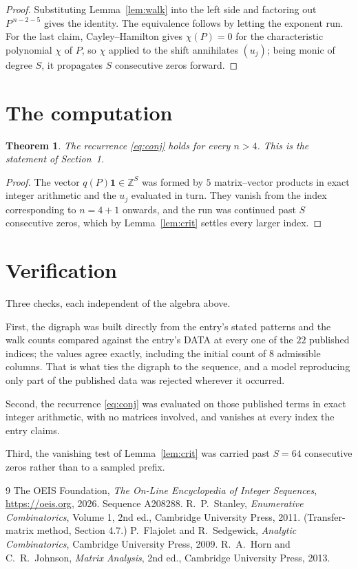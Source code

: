 \documentclass[11pt,a4paper]{article}
\theoremstyle{plain}
\newtheorem{theorem}{Theorem}
\theoremstyle{definition}
\begin{document}
\begin{proof}
Substituting Lemma~\ref{lem:walk} into the left side and factoring out
$P^{\,n-2-5}$ gives the identity. The equivalence follows by letting the exponent
run. For the last claim, Cayley--Hamilton gives $\chi(P)=0$ for the characteristic
polynomial $\chi$ of $P$, so $\chi$ applied to the shift annihilates $(u_j)$; being monic of
degree $S$, it propagates $S$ consecutive zeros forward.
\end{proof}

\section{The computation}

\begin{theorem}
The recurrence \eqref{eq:conj} holds for every $n>4$. This is the statement of
Section~1.
\end{theorem}

\begin{proof}
The vector $q(P)\mathbf{1}\in\mathbb{Z}^{S}$ was formed by $5$ matrix--vector
products in exact integer arithmetic and the $u_j$ evaluated in turn. They vanish from the
index corresponding to $n=4+1$ onwards, and the run was continued past $S$ consecutive
zeros, which by Lemma~\ref{lem:crit} settles every larger index.
\end{proof}

\section{Verification}

Three checks, each independent of the algebra above.

First, the digraph was built directly from the entry's stated patterns and the walk counts
compared against the entry's DATA at every one of the $22$ published indices; the
values agree exactly, including the initial count of $8$ admissible columns. That is
what ties the digraph to the sequence, and a model reproducing only part of the published
data was rejected wherever it occurred.

Second, the recurrence \eqref{eq:conj} was evaluated on those published terms in exact
integer arithmetic, with no matrices involved, and vanishes at every index the entry claims.

Third, the vanishing test of Lemma~\ref{lem:crit} was carried past $S=64$ consecutive
zeros rather than to a sampled prefix.

\begin{thebibliography}{9}
 The OEIS Foundation, \emph{The On-Line Encyclopedia of Integer
Sequences}, \url{https://oeis.org}, 2026. Sequence A208288.
 R.~P.~Stanley, \emph{Enumerative Combinatorics}, Volume 1, 2nd ed.,
Cambridge University Press, 2011. (Transfer-matrix method, Section 4.7.)
 P.~Flajolet and R.~Sedgewick, \emph{Analytic Combinatorics}, Cambridge
University Press, 2009.
 R.~A.~Horn and C.~R.~Johnson, \emph{Matrix Analysis}, 2nd ed., Cambridge
University Press, 2013.
\end{thebibliography}
\end{document}
